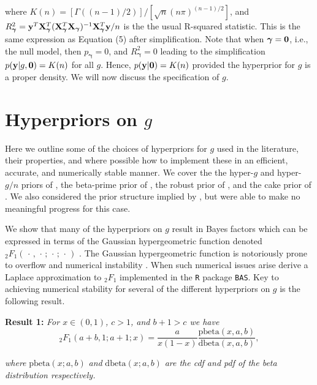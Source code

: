 \documentclass[12pt]{article}
\def\vectorfontone{\bf}
\def\vectorfonttwo{\boldsymbol}
\def\vy{{\vectorfontone y}}                      %
\def\vzero{{\vectorfontone 0}}
\def\vgamma{{\vectorfonttwo \gamma}}             %
\def\matrixfontone{\bf}
\def\mX{{\matrixfontone X}}                      %
\def\ds{\displaystyle}
\begin{document}
\noindent where $K(n) = [\Gamma( (n-1)/2 )]/[\sqrt{n}(n\pi)^{(n-1)/2}]$, and
$R_\vgamma^2 = \vy^T\mX_\vgamma^T(\mX_\vgamma^T\mX_\vgamma)^{-1}\mX_\vgamma^T\vy/n$ is 
the the usual R-squared statistic.
This is the same expression as \cite{Liang2008} Equation (5) 
after simplification. Note that
when $\vgamma = \vzero$, i.e., the null model, then $p_\vgamma = 0$, and
$R_\vgamma^2 = 0$ leading to the simplification $p(\vy|g,\vzero) = K(n)$
for all $g$. Hence, $p(\vy|\vzero) = K(n)$ provided the hyperprior for $g$ is a proper density. We will now discuss the specification of $g$.
 

\section{Hyperpriors on $g$}
\label{sec:hyperpriors}

Here we outline some of the choices of hyperpriors for $g$ used in the literature, their
properties, and where possible how to implement these in an efficient, 
accurate, and
numerically stable manner. We cover the 
the hyper-$g$ and hyper-$g/n$ priors of \cite{Liang2008}, the beta-prime prior
of \cite{Maruyama2011}, the robust prior of \cite{Bayarri2012}, and the cake
prior of \cite{OrmerodEtal2017}.
We also considered the prior structure implied by \cite{Zellner1980}, but were able to make no
meaningful progress for this case.

We show that many of the hyperpriors on $g$ result in Bayes factors which can be expressed
in terms of the Gaussian hypergeometric function denoted 
${}_2F_1(\,\cdot\,,\,\cdot\,;\,\cdot\,;\,\cdot\,)$ \citep[see for example Chapter 15 of ][]{Abramowitz1972}.
The Gaussian hypergeometric function is notoriously prone 
to overflow and numerical instability \citep{Pearson2017}. 
When such numerical issues arise 
\cite{Liang2008} derive a Laplace approximation to ${}_2F_1$ implemented in the {\tt R} package {\tt BAS}.
Key to achieving numerical stability for several of the different hyperpriors on $g$ is the following result.

\bigskip 
\noindent 
{\bf Result 1:} {\it For $x\in(0,1)$, $c>1$, and $b +1 > c$ we have}
\begin{equation}\label{eq:logGuassHypergeometric2}
\ds {}_2F_1(a+b,1;a+1;x) = \frac{a}{x(1 - x)}   \frac{\mbox{pbeta}(x,a,b)}{\mbox{dbeta}(x,a,b)},
\end{equation}

\noindent 
{\it where} $\mbox{pbeta}(x;a,b)$ {\it and} $\mbox{dbeta}(x;a,b)$ {\it are the cdf and pdf of the beta 
distribution respectively.}
\end{document}
